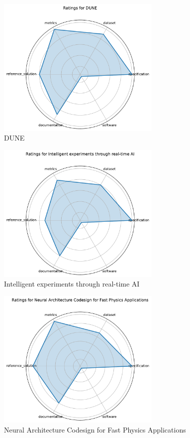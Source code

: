 \documentclass{article}
\begin{document}
\begin{figure}[h!]
  \centering
  \includegraphics[width=0.7\textwidth]{DUNE_radar.pdf}
  \caption{DUNE}
\end{figure}

\begin{figure}[h!]
  \centering
  \includegraphics[width=0.7\textwidth]{Intelligent experiments through real-time AI_radar.pdf}
  \caption{Intelligent experiments through real-time AI}
\end{figure}

\begin{figure}[h!]
  \centering
  \includegraphics[width=0.7\textwidth]{Neural Architecture Codesign for Fast Physics Applications_radar.pdf}
  \caption{Neural Architecture Codesign for Fast Physics Applications}
\end{figure}
\end{document}
